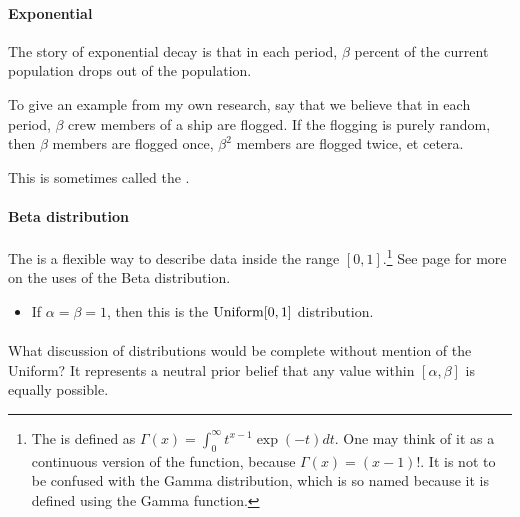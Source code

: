 \paragraph{Exponential}

The story of exponential decay is that in each period, $\beta$ percent
of the current population drops out of the population.

To give an example from my own research, say that we believe that in
each period, $\beta$ crew members of a ship are flogged. If the flogging
is purely random, then $\beta$ members are flogged once, $\beta^2$
members are flogged twice, et cetera.

This is sometimes called the .



\paragraph{Beta distribution} The  is a flexible
way to describe data inside the range $[0, 1]$.\footnote{The  is defined as $\Gamma(x) = \int_0^\infty  t^{x-1} \exp(-t)
dt$. One may think of it as a continuous version of the 
function, because $\Gamma(x) = (x-1)!$. It is not to be confused with
the Gamma distribution, which is so named because it is defined using
the Gamma function.}
See page \pageref{beta} for more on the uses of the Beta distribution.


\begin{itemize}
\item If $\alpha = \beta = 1$, then this is the ${\rm Uniform}[0,1]$ distribution.
\end{itemize}


\paragraph{} What discussion of distributions
would be complete without mention of the Uniform? It represents a neutral
prior belief that any value within $[\alpha, \beta]$ is equally possible.

